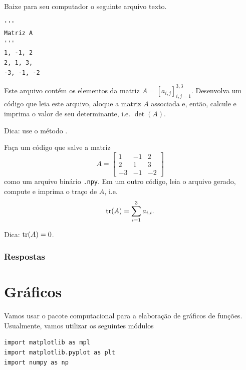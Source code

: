 \begin{exer}
  Baixe para seu computador o seguinte arquivo texto.

\begin{lstlisting}[caption=mat.txt]
'''
Matriz A
'''
1, -1, 2
2, 1, 3,
-3, -1, -2
\end{lstlisting}

Este arquivo contém os elementos da matriz $A = [a_{i,j}]_{i,j=1}^{3,3}$. Desenvolva um código que leia este arquivo, aloque a matriz $A$ associada e, então, calcule e imprima o valor de seu determinante, i.e. $\det(A)$.
\end{exer}
\begin{resp}
  Dica: use o método {\PYTHONstrDOTsplit}.
\end{resp}

\begin{exer}
  Faça um código que salve a matriz
  \begin{equation}
    A =
    \begin{bmatrix}
      1 & -1 & 2\\
      2 & 1 & 3\\
      -3 & -1 & -2
    \end{bmatrix}
  \end{equation}
  como um arquivo binário \texttt{.npy}. Em um outro código, leia o arquivo gerado, compute e imprima o traço de $A$, i.e.
  \begin{equation}
    \operatorname{tr}(A) = \sum_{i=1}^3 a_{i,i}.
  \end{equation}
\end{exer}
\begin{resp}
  Dica: $\operatorname{tr}(A) = 0$.
\end{resp}

\ifisbook
\subsubsection{Respostas}
\shipoutAnswer
\fi

\section{Gráficos}\label{cap_ag_sec_graf}

Vamos usar o pacote computacional {\PYTHONmatplotlib} para a elaboração de gráficos de funções. Usualmente, vamos utilizar os seguintes módulos {\python}

\begin{lstlisting}
import matplotlib as mpl
import matplotlib.pyplot as plt
import numpy as np
\end{lstlisting}

